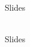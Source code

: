 \begin{multicols}{2}
    \Huge{Slides}\\
    \vspace{1cm}\\
    \normalsize{
      \noindent 
      \blindtext
    }

    \newcolumn

    \Huge{Slides}\\
    \vspace{1cm}\\
    \normalsize{
      \noindent
      \blindtext
    }

    \end{multicols}